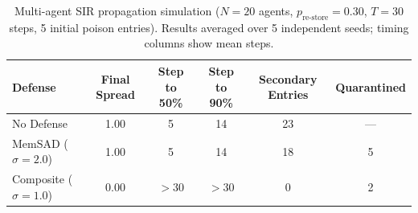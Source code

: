 \begin{table}[h]
  \centering
  \small
  \caption{Multi-agent SIR propagation simulation ($N=20$ agents, $p_{\text{re-store}}=0.30$, $T=30$ steps, 5 initial poison entries). Results averaged over 5 independent seeds; timing columns show mean steps.}
  \label{tab:sir_propagation}
  \vspace{2pt}
  \begin{tabular}{l cccc c}
    \toprule
    Defense & Final Spread & Step to 50\% & Step to 90\% & Secondary Entries & Quarantined \\
    \midrule
    No Defense & 1.00 & 5 & 14 & 23 & --- \\
    MemSAD ($\sigma=2.0$) & 1.00 & 5 & 14 & 18 & 5 \\
    Composite ($\sigma=1.0$) & 0.00 & $>$30 & $>$30 & 0 & 2 \\
    \bottomrule
  \end{tabular}
\end{table}
